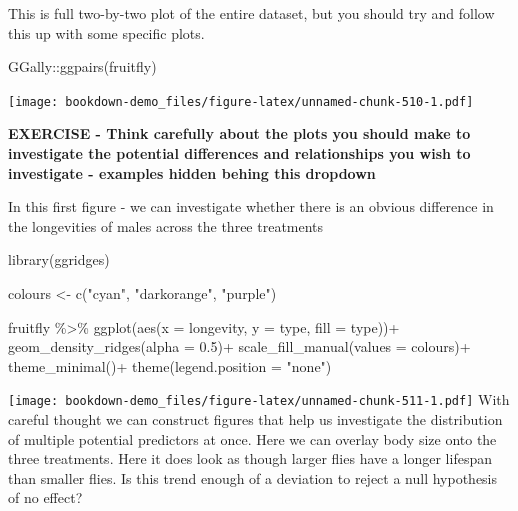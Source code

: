 \documentclass[
]{book}
\newenvironment{Shaded}{\begin{snugshade}}{\end{snugshade}}
\newcommand{\AttributeTok}[1]{\textcolor[rgb]{0.77,0.63,0.00}{#1}}
\newcommand{\FloatTok}[1]{\textcolor[rgb]{0.00,0.00,0.81}{#1}}
\newcommand{\FunctionTok}[1]{\textcolor[rgb]{0.00,0.00,0.00}{#1}}
\newcommand{\NormalTok}[1]{#1}
\newcommand{\OtherTok}[1]{\textcolor[rgb]{0.56,0.35,0.01}{#1}}
\newcommand{\SpecialCharTok}[1]{\textcolor[rgb]{0.00,0.00,0.00}{#1}}
\newcommand{\StringTok}[1]{\textcolor[rgb]{0.31,0.60,0.02}{#1}}
\begin{document}
This is full two-by-two plot of the entire dataset, but you should try and follow this up with some specific plots.

\begin{Shaded}
\begin{Highlighting}[]
\NormalTok{GGally}\SpecialCharTok{::}\FunctionTok{ggpairs}\NormalTok{(fruitfly)}
\end{Highlighting}
\end{Shaded}

\texttt{[image: bookdown-demo\_files/figure-latex/unnamed-chunk-510-1.pdf]}

\textbf{EXERCISE - Think carefully about the plots you should make to investigate the potential differences and relationships you wish to investigate - examples hidden behing this dropdown}

In this first figure - we can investigate whether there is an obvious difference in the longevities of males across the three treatments

\begin{Shaded}
\begin{Highlighting}[]
\FunctionTok{library}\NormalTok{(ggridges)}

\NormalTok{colours }\OtherTok{\textless{}{-}} \FunctionTok{c}\NormalTok{(}\StringTok{"cyan"}\NormalTok{, }\StringTok{"darkorange"}\NormalTok{, }\StringTok{"purple"}\NormalTok{)}

\NormalTok{fruitfly }\SpecialCharTok{\%\textgreater{}\%} 
  \FunctionTok{ggplot}\NormalTok{(}\FunctionTok{aes}\NormalTok{(}\AttributeTok{x =}\NormalTok{ longevity, }\AttributeTok{y =}\NormalTok{ type, }\AttributeTok{fill =}\NormalTok{ type))}\SpecialCharTok{+}
  \FunctionTok{geom\_density\_ridges}\NormalTok{(}\AttributeTok{alpha =} \FloatTok{0.5}\NormalTok{)}\SpecialCharTok{+}
  \FunctionTok{scale\_fill\_manual}\NormalTok{(}\AttributeTok{values =}\NormalTok{ colours)}\SpecialCharTok{+}
  \FunctionTok{theme\_minimal}\NormalTok{()}\SpecialCharTok{+}
  \FunctionTok{theme}\NormalTok{(}\AttributeTok{legend.position =} \StringTok{"none"}\NormalTok{)}
\end{Highlighting}
\end{Shaded}

\texttt{[image: bookdown-demo\_files/figure-latex/unnamed-chunk-511-1.pdf]}
With careful thought we can construct figures that help us investigate the distribution of multiple potential predictors at once. Here we can overlay body size onto the three treatments. Here it does look as though larger flies have a longer lifespan than smaller flies. Is this trend enough of a deviation to reject a null hypothesis of no effect?
\end{document}
